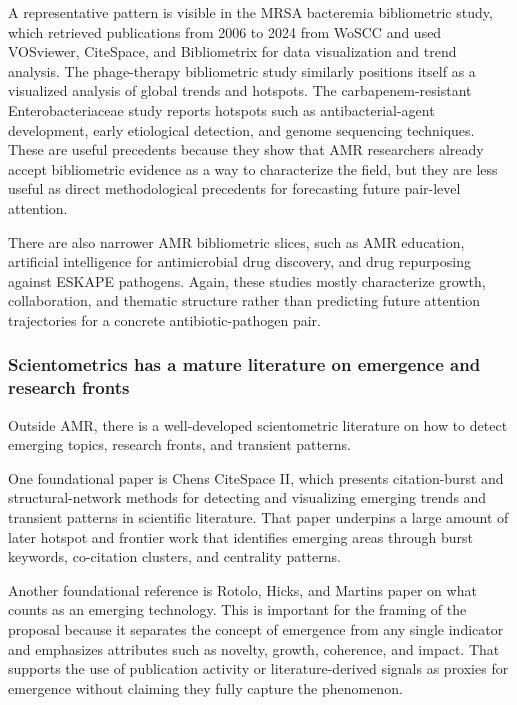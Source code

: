 \documentclass[
]{article}
\begin{document}
A representative pattern is visible in the MRSA bacteremia bibliometric
study, which retrieved publications from 2006 to 2024 from WoSCC and
used VOSviewer, CiteSpace, and Bibliometrix for data visualization and
trend analysis. The phage-therapy bibliometric study similarly positions
itself as a visualized analysis of global trends and hotspots. The
carbapenem-resistant Enterobacteriaceae study reports hotspots such as
antibacterial-agent development, early etiological detection, and genome
sequencing techniques. These are useful precedents because they show
that AMR researchers already accept bibliometric evidence as a way to
characterize the field, but they are less useful as direct
methodological precedents for forecasting future pair-level attention.

There are also narrower AMR bibliometric slices, such as AMR education,
artificial intelligence for antimicrobial drug discovery, and drug
repurposing against ESKAPE pathogens. Again, these studies mostly
characterize growth, collaboration, and thematic structure rather than
predicting future attention trajectories for a concrete
antibiotic-pathogen pair.

\subsubsection{Scientometrics has a mature literature on emergence
and research
fronts}\label{2-scientometrics-has-a-mature-literature-on-emergence-and-research-fronts}

Outside AMR, there is a well-developed scientometric literature on how
to detect emerging topics, research fronts, and transient patterns.

One foundational paper is Chen\textquotesingle s CiteSpace II, which
presents citation-burst and structural-network methods for detecting and
visualizing emerging trends and transient patterns in scientific
literature. That paper underpins a large amount of later hotspot and
frontier work that identifies emerging areas through burst keywords,
co-citation clusters, and centrality patterns.

Another foundational reference is Rotolo, Hicks, and
Martin\textquotesingle s paper on what counts as an emerging technology.
This is important for the framing of the proposal because it separates
the concept of emergence from any single indicator and emphasizes
attributes such as novelty, growth, coherence, and impact. That supports
the use of publication activity or literature-derived signals as proxies
for emergence without claiming they fully capture the phenomenon.
\end{document}
